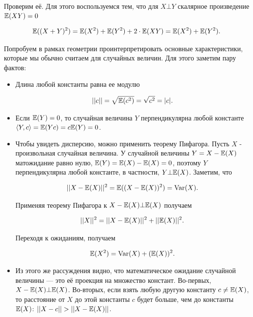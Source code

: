 \documentclass[12pt, a4paper, oneside]{article}
\begin{document}
Проверим её. Для этого воспользуемся тем, что для $X \bot Y$ скалярное произведение $\mathbb{E}(XY) = 0$ 

\[
\mathbb{E}((X + Y)^2) = \mathbb{E}(X^{2}) + \mathbb{E}(Y^{2}) + 2 \cdot \mathbb{E}(XY) = \mathbb{E}(X^{2}) + \mathbb{E}(Y^{2}).
\]

Попробуем в рамках геометрии проинтерпретировать основные характеристики, которые мы обычно считаем для случайных величин. Для этого заметим пару фактов: 

\begin{itemize} 

\item  Длина любой константы равна ее модулю

$$||c||=\sqrt{\mathbb{E}(c^{2})}=\sqrt{c^{2}}=|c|.$$ 

\item Если $\mathbb{E}(Y)=0$, то случайная величина $Y$ перпендикулярна любой константе $\langle Y, c \rangle=\mathbb{E}(Yc)=c\mathbb{E}(Y)=0$.

\item Чтобы увидеть дисперсию, можно применить теорему Пифагора. Пусть $X$ - произвольная случайная величина. У случайной величины $Y=X-\mathbb{E}(X)$ матожидание равно нулю, $\mathbb{E}(Y)=\mathbb{E}(X)-\mathbb{E}(X)=0$, поэтому $Y$ перпендикулярна любой константе, в частности, $Y\bot \mathbb{E}(X)$. Заметим, что

$$||X-\mathbb{E}(X)||^{2}=\mathbb{E}((X-\mathbb{E}(X))^{2})=\operatorname{Var}(X).$$

Применяя теорему Пифагора к $X-\mathbb{E}(X) \bot \mathbb{E}(X)$ получаем

$$||X||^{2}=||X-\mathbb{E}(X)||^{2}+||\mathbb{E}(X)||^{2}.$$

\begin{center} 
\end{center}

Переходя к ожиданиям, получаем 

$$ \mathbb{E}(X^{2})=\operatorname{Var}(X)+(\mathbb{E}(X))^{2}.$$

\item Из этого же рассуждения видно, что математическое ожидание случайной величины --- это её проекция на множество констант.  Во-первых, $X - \mathbb{E}(X) \bot \mathbb{E}(X)$. Во-вторых, если взять любую другую константу $c\neq \mathbb{E}(X)$, то расстояние от $X$ до этой константы $c$ будет больше, чем до константы $\mathbb{E}(X)$: $||X-c||>||X-\E(X)||$. 


\end{itemize}
\end{document}
